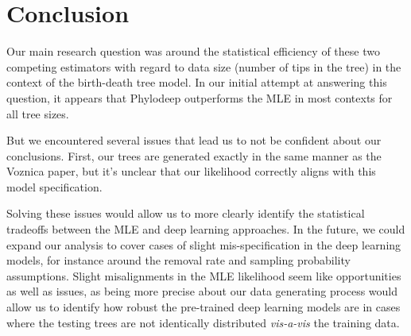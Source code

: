 \documentclass[a4paper]{article}
\begin{document}
\section{Conclusion}

Our main research question was around the statistical efficiency of these two competing estimators
with regard to data size (number of tips in the tree) in the context of the birth-death tree model.
In our initial attempt at answering this question, it appears that Phylodeep outperforms the MLE in 
most contexts for all tree sizes. 

But we encountered several issues that lead us to not be confident about our conclusions. First,
our trees are generated exactly in the same manner as the Voznica paper, but it's unclear that our likelihood correctly aligns with this model specification. 

    
Solving these issues would allow us to more clearly identify the statistical tradeoffs between the MLE
and deep learning approaches. In the future, we could expand our analysis to cover cases of slight mis-specification in 
the deep learning models, for instance around the removal rate and sampling probability assumptions. Slight misalignments
in the MLE likelihood seem like opportunities as well as issues, as being more precise about our data generating
process would allow us to identify how robust the pre-trained deep learning models are in cases where the testing trees are not identically distributed \textit{vis-a-vis} the training data.

\printbibliography
	
\end{document}
